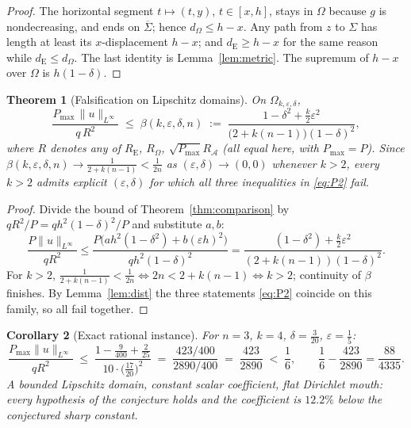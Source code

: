 \documentclass[10pt]{article}
\newtheorem{theorem}{Theorem}[section]
\newtheorem{corollary}[theorem]{Corollary}
\theoremstyle{remark}
\newcommand{\A}{\mathcal{A}}
\newcommand{\Om}{\Omega}
\newcommand{\Sig}{\Sigma}
\newcommand{\Pmax}{P_{\max}}
\newcommand{\dE}{d_{\mathrm{E}}}
\newcommand{\dP}{d_{\Om}}
\newcommand{\norminf}[1]{\|#1\|_{L^\infty}}
\newcommand{\eps}{\varepsilon}
\begin{document}
\begin{proof}
The horizontal segment $t\mapsto(t,y)$, $t\in[x,h]$, stays in $\Om$ because $g$
is nondecreasing, and ends on $\overline\Sig$; hence $\dP\le h-x$. Any path from
$z$ to $\Sig$ has length at least its $x$-displacement $h-x$; and
$\dE\ge h-x$ for the same reason while $\dE\le\dP$. The last identity is
Lemma~\ref{lem:metric}. The supremum of $h-x$ over $\Om$ is $h(1-\delta)$.
\end{proof}

\begin{theorem}[Falsification on Lipschitz domains]\label{thm:A}
On $\Om_{k,\eps,\delta}$,
\begin{equation}\label{eq:beta}
\frac{\Pmax\,\norminf{u}}{q\,R^2}
\;\le\;\beta(k,\eps,\delta,n)
\;:=\;\frac{1-\delta^2+\tfrac{k}{2}\eps^2}{\bigl(2+k(n-1)\bigr)(1-\delta)^2},
\end{equation}
where $R$ denotes any of $R_{\mathrm E}$, $R_\Om$, $\sqrt{\Pmax}R_\A$
(all equal here, with $\Pmax=P$). Since
$\beta(k,\eps,\delta,n)\to \frac{1}{2+k(n-1)}<\frac{1}{2n}$ as
$(\eps,\delta)\to(0,0)$ whenever $k>2$, every $k>2$ admits explicit
$(\eps,\delta)$ for which \emph{all three} inequalities in \eqref{eq:P2} fail.
\end{theorem}

\begin{proof}
Divide the bound of Theorem~\ref{thm:comparison} by
$qR^2/P=qh^2(1-\delta)^2/P$ and substitute $a,b$:
\[
\frac{P\norminf{u}}{qR^2}
\le \frac{P\bigl(ah^2(1-\delta^2)+b(\eps h)^2\bigr)}{qh^2(1-\delta)^2}
=\frac{(1-\delta^2)+\tfrac k2\eps^2}{(2+k(n-1))(1-\delta)^2}.
\]
For $k>2$, $\tfrac1{2+k(n-1)}<\tfrac1{2n}\iff 2n<2+k(n-1)\iff k>2$; continuity
of $\beta$ finishes. By Lemma~\ref{lem:dist} the three statements
\eqref{eq:P2} coincide on this family, so all fail together.
\end{proof}

\begin{corollary}[Exact rational instance]\label{cor:instance}
For $n=3$, $k=4$, $\delta=\tfrac{3}{20}$, $\eps=\tfrac15$:
\[
\frac{\Pmax\norminf{u}}{qR^2}
\;\le\;\frac{1-\tfrac{9}{400}+\tfrac{2}{25}}{10\cdot\bigl(\tfrac{17}{20}\bigr)^{2}}
\;=\;\frac{423/400}{2890/400}
\;=\;\frac{423}{2890}\;<\;\frac16,
\qquad \frac16-\frac{423}{2890}=\frac{88}{4335}.
\]
A bounded Lipschitz domain, constant scalar coefficient, flat Dirichlet mouth:
every hypothesis of the conjecture holds and the coefficient is $12.2\%$ below
the conjectured sharp constant.
\end{corollary}
\end{document}
